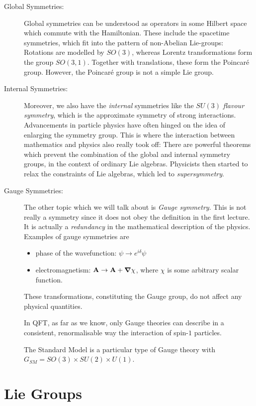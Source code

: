 \begin{description}
  \item[Global Symmetries:] 
  Global symmetries can be understood as operators in some Hilbert space which commute with the Hamiltonian.
  These include the spacetime symmetries, which fit into the pattern of non-Abelian Lie-groups:
  Rotations are modelled by $SO(3)$, whereas Lorentz transformations form the group $SO(3, 1)$. Together with translations, these form the Poincaré group.  However, the Poincar\'e group is not a simple Lie group. 
  \item[Internal Symmetries:]
  Moreover, we also have the \emph{internal} symmetries like the $SU(3)$ \emph{flavour symmetry}, which is the approximate symmetry of strong interactions.
  Advancements in particle physics have often hinged on the idea of enlarging the symmetry group. This is where the interaction between mathematics and physics also really took off: There are powerful theorems which prevent the combination of the global and internal symmetry groups, in the context of ordinary Lie algebras.
  Physicists then started to relax the constraints of Lie algebras, which led to \emph{supersymmetry}.
\item[Gauge Symmetries:]
  The other topic which we will talk about is \emph{Gauge symmetry}. This is not really a symmetry since it does not obey the definition in the first lecture. It is actually a \emph{redundancy} in the mathematical description of the physics.
  Examples of gauge symmetries are
  \begin{itemize}
    \item phase of the wavefunction: $\psi \to e^{i\delta} \psi$
    \item electromagnetism: $\vb{A} \to \vb{A} + \grad \chi$, where $\chi$ is some arbitrary scalar function.
  \end{itemize}
  These transformations, constituting the Gauge group, do not affect any physical quantities.
  \begin{leftbar}
    \begin{remark}
      In QFT, as far as we know, only Gauge theories can describe in a consistent, renormalisable way the interaction of spin-$1$ particles.
    \end{remark}
  \end{leftbar}
  The Standard Model is a particular type of Gauge theory with $G_{SM} = SO(3) \times SU(2) \times U(1)$.
\end{description}

\chapter{Lie Groups}%
\label{cha:lie_groups}

